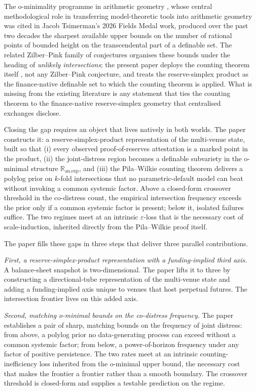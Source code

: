 \documentclass[12pt]{article}
\theoremstyle{sampledef}
\theoremstyle{sampleplain}
\theoremstyle{sampleremark}
\newcommand{\R}{\mathbb{R}}
\newcommand{\1}{\mathbf{1}}
\begin{document}
The o-minimality programme in arithmetic geometry
\citep{PilaWilkie2006, vandenDries1998Tame,
Pila2011ManinMumford, BakkerKlinglerTsimerman2020,
PeterzilStarchenko2009}, whose central methodological role in
transferring model-theoretic tools into arithmetic geometry was
cited in Jacob Tsimerman's 2026 Fields Medal work, produced over
the past two decades the sharpest available upper bounds on the
number of rational points of bounded height on the transcendental
part of a definable set. The
related Zilber--Pink family of conjectures
\citep{Pink2005ZilberPink, Zilber2002} organises these bounds under
the heading of \emph{unlikely intersections}; the present paper
deploys the counting theorem itself \citep{PilaWilkie2006}, not any
Zilber--Pink conjecture, and treats the reserve-simplex product as
the finance-native definable set to which the counting theorem is
applied. What is missing from the existing literature is any
statement that ties the counting theorem to the finance-native
reserve-simplex geometry that centralised exchanges disclose.

Closing the gap requires an object that lives natively in both worlds.
The paper constructs it: a reserve-simplex-product representation of
the multi-venue state, built so that (i) every observed proof-of-reserves
attestation is a marked point in the product, (ii) the joint-distress
region becomes a definable subvariety in the o-minimal structure
$\R_{\text{an,exp}}$, and (iii) the Pila--Wilkie counting theorem
delivers a polylog prior on $k$-fold intersections that no
parametric-default model can beat without invoking a common systemic
factor. Above a closed-form crossover threshold in the co-distress
count, the empirical intersection frequency exceeds the prior only if
a common systemic factor is present; below it, isolated failures
suffice. The two regimes meet at an intrinsic $\varepsilon$-loss that
is the necessary cost of scale-induction, inherited directly from the
Pila--Wilkie proof itself.

The paper fills these gaps in three steps that deliver three parallel
contributions.

\emph{First, a reserve-simplex-product representation with a
funding-implied third axis.} A balance-sheet snapshot is
two-dimensional. The paper lifts it to three by constructing a
directional-tube representation of the multi-venue state and
adding a funding-implied axis unique to venues that host perpetual
futures. The intersection frontier lives on this added axis.

\emph{Second, matching o-minimal bounds on the co-distress
frequency.} The paper establishes a pair of sharp, matching bounds
on the frequency of joint distress: from above, a polylog prior no
data-generating process can exceed without a common systemic factor;
from below, a power-of-horizon frequency under any factor of
positive persistence. The two rates meet at an intrinsic
counting-inefficiency loss inherited from the o-minimal upper bound,
the necessary cost that makes the frontier a frontier rather than
a smooth boundary. The crossover threshold is closed-form and
supplies a testable prediction on the regime.
\end{document}
